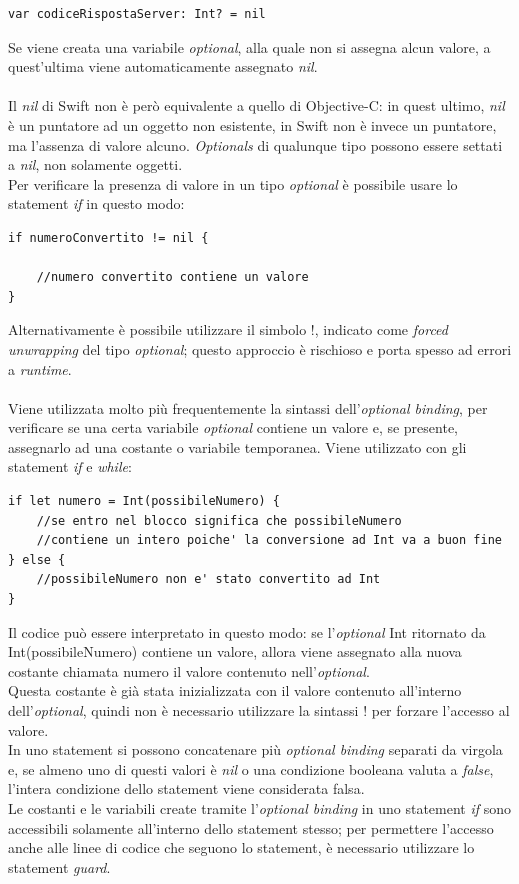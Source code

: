 \begin{lstlisting}
var codiceRispostaServer: Int? = nil
\end{lstlisting}
Se viene creata una variabile \textit{optional}, alla quale non si assegna alcun valore, a quest'ultima viene automaticamente assegnato \textit{nil}.\\\\Il \textit{nil} di Swift non è però equivalente a quello di Objective-C: in quest ultimo, \textit{nil} è un puntatore ad un oggetto non esistente, in Swift non è invece un puntatore, ma l'assenza di valore alcuno. \textit{Optionals} di qualunque tipo possono essere settati a \textit{nil}, non solamente oggetti.\\
Per verificare la presenza di valore in un tipo \textit{optional} è possibile usare lo statement \textit{if} in questo modo: 
\lstset{language=[Objective]C, breakindent=40pt, breaklines}
\begin{lstlisting}
if numeroConvertito != nil {

	//numero convertito contiene un valore
}
\end{lstlisting}
Alternativamente è possibile utilizzare il simbolo !, indicato come \textit{forced unwrapping} del tipo \textit{optional}; questo approccio è rischioso e porta spesso ad errori a \textit{runtime}.
\\\\Viene utilizzata molto più frequentemente la sintassi dell'\textit{optional binding}, per verificare se una certa variabile \textit{optional} contiene un valore e, se presente, assegnarlo ad una costante o variabile temporanea. Viene utilizzato con gli statement \textit{if} e \textit{while}:
\begin{lstlisting}
if let numero = Int(possibileNumero) {
	//se entro nel blocco significa che possibileNumero 
	//contiene un intero poiche' la conversione ad Int va a buon fine
} else {
	//possibileNumero non e' stato convertito ad Int
}
\end{lstlisting}
Il codice può essere interpretato in questo modo: se l'\textit{optional} Int ritornato da Int(possibileNumero) contiene un valore, allora viene assegnato alla nuova costante chiamata numero il valore contenuto nell'\textit{optional}. \\Questa costante è già stata inizializzata con il valore contenuto all'interno dell'\textit{optional}, quindi non è necessario utilizzare la sintassi ! per forzare l'accesso al valore.\\In uno statement si possono concatenare più \textit{optional binding} separati da virgola e, se almeno uno di questi valori è \textit{nil} o una condizione booleana valuta a \textit{false}, l'intera condizione dello statement viene considerata falsa.\\
Le costanti e le variabili create tramite l'\textit{optional binding} in uno statement \textit{if} sono accessibili solamente all'interno dello statement stesso; per permettere l'accesso anche alle linee di codice che seguono lo statement, è necessario utilizzare lo statement \textit{guard}.\newpage
